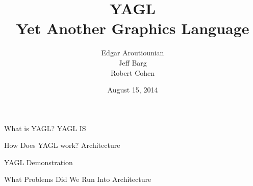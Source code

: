 \documentclass{beamer}
\title[YAGL]{YAGL\\Yet Another Graphics Language}
\author{Edgar Aroutiounian \\ Jeff Barg \\ Robert Cohen}
\institute{COMS S4115 - Programming Languages \& Translators \\ Columbia University}
\date{August 15, 2014}
\begin{document}
\begin{frame}
\titlepage
\end{frame}


\begin{frame}{What is YAGL?}
YAGL IS
\end{frame}

\begin{frame}{How Does YAGL work?}
Architecture
\end{frame}

\begin{frame}{YAGL Demonstration}

\end{frame}

\begin{frame}{What Problems Did We Run Into}
Architecture
\end{frame}
\end{document}
